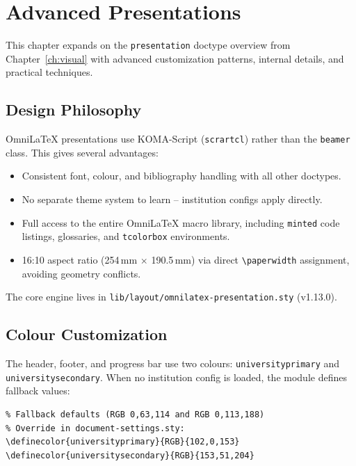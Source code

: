 \chapter{Advanced Presentations}
\label{ch:presentations}

This chapter expands on the \texttt{presentation} doctype overview from
Chapter~\ref{ch:visual} with advanced customization patterns, internal
details, and practical techniques.

\section{Design Philosophy}

OmniLaTeX presentations use KOMA-Script (\texttt{scrartcl}) rather than the
\texttt{beamer} class.  This gives several advantages:

\begin{itemize}
    \item Consistent font, colour, and bibliography handling with all other
          doctypes.
    \item No separate theme system to learn -- institution configs apply
          directly.
    \item Full access to the entire OmniLaTeX macro library, including
          \texttt{minted} code listings, glossaries, and \texttt{tcolorbox}
          environments.
    \item 16:10 aspect ratio (254\,mm $\times$ 190.5\,mm) via direct
          \texttt{\textbackslash paperwidth} assignment, avoiding geometry
          conflicts.
\end{itemize}

The core engine lives in
\texttt{lib/layout/omnilatex-presentation.sty} (v1.13.0).

\section{Colour Customization}

The header, footer, and progress bar use two colours:
\texttt{universityprimary} and \texttt{universitysecondary}.  When no
institution config is loaded, the module defines fallback values:

\begin{verbatim}
% Fallback defaults (RGB 0,63,114 and RGB 0,113,188)
% Override in document-settings.sty:
\definecolor{universityprimary}{RGB}{102,0,153}
\definecolor{universitysecondary}{RGB}{153,51,204}
\end{verbatim}

